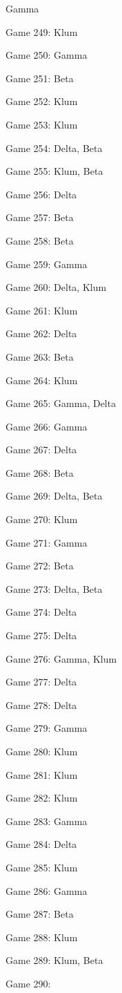 \documentclass{article}
\begin{document}
\begin{multicols}{3}
\begin{compactitem}
Gamma
\item Game 249:
Klum
\item Game 250:
Gamma
\item Game 251:
Beta
\item Game 252:
Klum
\item Game 253:
Klum
\item Game 254:
Delta, Beta
\item Game 255:
Klum, Beta
\item Game 256:
Delta
\item Game 257:
Beta
\item Game 258:
Beta
\item Game 259:
Gamma
\item Game 260:
Delta, Klum
\item Game 261:
Klum
\item Game 262:
Delta
\item Game 263:
Beta
\item Game 264:
Klum
\item Game 265:
Gamma, Delta
\item Game 266:
Gamma
\item Game 267:
Delta
\item Game 268:
Beta
\item Game 269:
Delta, Beta
\item Game 270:
Klum
\item Game 271:
Gamma
\item Game 272:
Beta
\item Game 273:
Delta, Beta
\item Game 274:
Delta
\item Game 275:
Delta
\item Game 276:
Gamma, Klum
\item Game 277:
Delta
\item Game 278:
Delta
\item Game 279:
Gamma
\item Game 280:
Klum
\item Game 281:
Klum
\item Game 282:
Klum
\item Game 283:
Gamma
\item Game 284:
Delta
\item Game 285:
Klum
\item Game 286:
Gamma
\item Game 287:
Beta
\item Game 288:
Klum
\item Game 289:
Klum, Beta
\item Game 290:

\end{compactitem}
\end{multicols}
\end{document}
